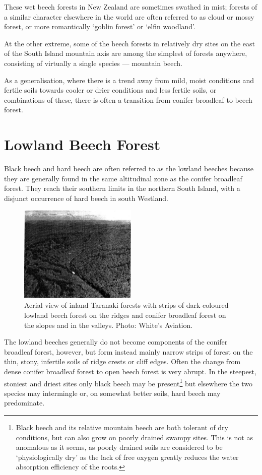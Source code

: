 These wet beech forests in New Zealand are sometimes swathed in mist; forests of a similar character elsewhere in the world are often referred to as cloud or mossy forest, or more romantically `goblin forest' or `elfin woodland'.

At the other extreme, some of the beech forests in relatively dry sites on the east of the South Island mountain axis are among the simplest of forests anywhere, consisting of virtually a single species --- mountain beech.

As a generalisation, where there is a trend away from mild, moist conditions and fertile soils towards cooler or drier conditions and less fertile soils, or combinations of these, there is often a transition from conifer broadleaf to beech forest.

\section{Lowland Beech Forest}

Black beech and hard beech are often referred to as the lowland beeches because they are generally found in the same altitudinal zone as the conifer broadleaf forest.
They reach their southern limits in the northern South Island, with a disjunct occurrence of hard beech in south Westland.

\begin{figure}
	\includegraphics[width=0.5\textwidth]{graphics/figure73taranaki-forests.jpg}
	\centering
	\caption[Aerial view of inland Taranaki forests]{Aerial view of inland Taranaki forests with strips of dark-coloured lowland beech forest on the ridges and conifer broadleaf forest on the slopes and in the valleys.
	Photo: White's Aviation.}%
	\label{fig:73taranaki-forests}
\end{figure}

The lowland beeches generally do not become components of the conifer broadleaf forest, however, but form instead mainly narrow strips of forest on the thin, stony, infertile soils of ridge crests or cliff edges.
Often the change from dense conifer broadleaf forest to open beech forest is very abrupt.
In the steepest, stoniest and driest sites only black beech may be present\footnote{Black beech and its relative mountain beech are both tolerant of dry conditions, but can also grow on poorly drained swampy sites. This is not as anomalous as it seems, as poorly drained soils are considered to be `physiologically dry' as the lack of free oxygen greatly reduces the water absorption efficiency of the roots.} but elsewhere the two species may intermingle or, on somewhat better soils, hard beech may predominate.

